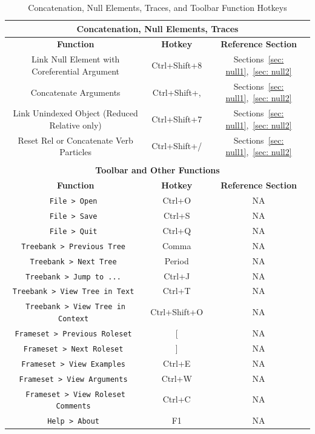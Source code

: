 \documentclass[11pt]{report}
\begin{document}
\pagebreak

\begin{table}[htp]
\centering
\begin{tabular}{|c|c|c|}
\hline \multicolumn{3}{|c|}{\textbf{Concatenation, Null Elements, Traces}} \\
\hline \textbf{Function} & \textbf{Hotkey} & \textbf{Reference Section} \\
\hline Link Null Element with Coreferential Argument & Ctrl+Shift+8 & Sections~\ref{sec: null1},~\ref{sec: null2} \\
\hline Concatenate Arguments & Ctrl+Shift+, & Sections~\ref{sec: null1},~\ref{sec: null2} \\
\hline Link Unindexed Object (Reduced Relative only) & Ctrl+Shift+7 & Sections~\ref{sec: null1},~\ref{sec: null2} \\
\hline Reset Rel or Concatenate Verb Particles & Ctrl+Shift+/ & Sections~\ref{sec: null1},~\ref{sec: null2} \\
\hline \multicolumn{3}{c}{} \\
\hline \multicolumn{3}{|c|}{\textbf{Toolbar and Other Functions}} \\
\hline \textbf{Function} & \textbf{Hotkey} & \textbf{Reference Section} \\
\hline \tt File > Open & Ctrl+O & NA \\
\hline \tt File > Save & Ctrl+S & NA \\
\hline \tt File > Quit & Ctrl+Q & NA \\
\hline \tt Treebank > Previous Tree & Comma & NA \\
\hline \tt Treebank > Next Tree & Period & NA \\
\hline \tt Treebank > Jump to ... & Ctrl+J & NA \\
\hline \tt Treebank > View Tree in Text & Ctrl+T & NA \\
\hline \tt Treebank > View Tree in Context & Ctrl+Shift+O & NA \\
\hline \tt Frameset > Previous Roleset & [ & NA \\
\hline \tt Frameset > Next Roleset & ] & NA \\
\hline \tt Frameset > View Examples & Ctrl+E & NA \\
\hline \tt Frameset > View Arguments & Ctrl+W & NA \\
\hline \tt Frameset > View Roleset Comments & Ctrl+C & NA \\
\hline \tt Help > About & F1 & NA \\
\hline 
\end{tabular}
\label{tbl: JubHotkeys2}
\caption{Concatenation, Null Elements, Traces, and Toolbar Function Hotkeys}
\end{table} 

\pagebreak


\end{document}
